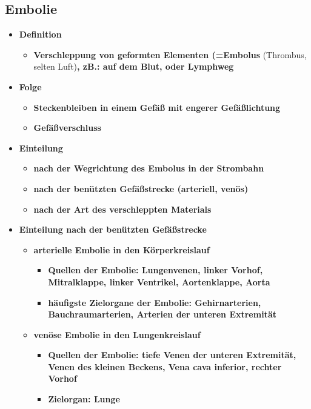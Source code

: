 \subsection{Embolie}
	\begin{itemize}
		\item \textbf{Definition}
			\begin{itemize}
				\item \textbf{Verschleppung von geformten Elementen (=Embolus} (Thrombus, selten Luft)\textbf{, zB.: auf dem Blut, oder Lymphweg}
			\end{itemize}
		\item \textbf{Folge}
				\begin{itemize}
					\item \textbf{Steckenbleiben in einem Gefäß mit engerer Gefäßlichtung}
					\item \textbf{Gefäßverschluss}
				\end{itemize}
		\item \textbf{Einteilung}
			\begin{itemize}
				\item \textbf{nach der Wegrichtung des Embolus in der Strombahn}
				\item \textbf{nach der benützten Gefäßstrecke (arteriell, venös)}
				\item \textbf{nach der Art des verschleppten Materials}
			\end{itemize}
		\item \textbf{Einteilung nach der benützten Gefäßstrecke}
			\begin{itemize}
				\item \textbf{arterielle Embolie in den Körperkreislauf}
					\begin{itemize}
						\item \textbf{Quellen der Embolie: Lungenvenen, linker Vorhof, Mitralklappe, linker Ventrikel, Aortenklappe, Aorta}
						\item \textbf{häufigste Zielorgane der Embolie: Gehirnarterien, Bauchraumarterien, Arterien der unteren Extremität}
					\end{itemize}
				\item \textbf{venöse Embolie in den Lungenkreislauf}
					\begin{itemize}
						\item \textbf{Quellen der Embolie: tiefe Venen der unteren Extremität, Venen des kleinen Beckens, Vena cava inferior, rechter Vorhof}
						\item \textbf{Zielorgan: Lunge}
					\end{itemize}
			\end{itemize}
	\end{itemize}
	
